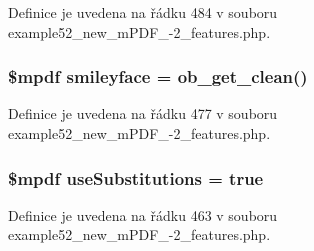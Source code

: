 Definice je uvedena na řádku 484 v souboru example52\-\_\-new\-\_\-m\-P\-D\-F\-\_-\/2\-\_\-features.\-php.

\hypertarget{example52__new__m_p_d_f__4-2__features_8php_ae322569e573ff1e02d1ed1bdd180206a}{
\subsubsection[{smileyface}]{\setlength{\rightskip}{0pt plus 5cm}\$mpdf smileyface = ob\-\_\-get\-\_\-clean()}}\label{example52__new__m_p_d_f__4-2__features_8php_ae322569e573ff1e02d1ed1bdd180206a}


Definice je uvedena na řádku 477 v souboru example52\-\_\-new\-\_\-m\-P\-D\-F\-\_-\/2\-\_\-features.\-php.

\hypertarget{example52__new__m_p_d_f__4-2__features_8php_aa2ce4c2c0ab99d3365e4d7366a9be33a}{
\subsubsection[{use\-Substitutions}]{\setlength{\rightskip}{0pt plus 5cm}\$mpdf use\-Substitutions = true}}\label{example52__new__m_p_d_f__4-2__features_8php_aa2ce4c2c0ab99d3365e4d7366a9be33a}


Definice je uvedena na řádku 463 v souboru example52\-\_\-new\-\_\-m\-P\-D\-F\-\_-\/2\-\_\-features.\-php.

